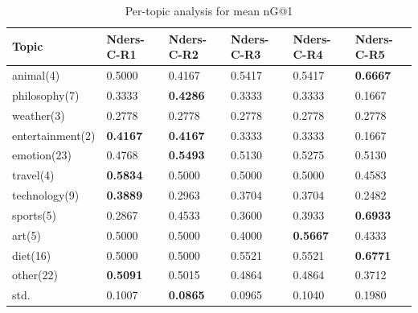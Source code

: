 \documentclass{sig-alternate}
\begin{document}
\begin{table}[]
\centering
\caption{Per-topic analysis for mean nG@1}
\label{my-label}
\begin{tabular}{llllll}
\hline
Topic & Nders-C-R1 & Nders-C-R2 & Nders-C-R3 & Nders-C-R4 & Nders-C-R5 \\
\hline
animal(4) & 0.5000 & 0.4167 & 0.5417 & 0.5417 & \textbf{0.6667} \\
philosophy(7) & 0.3333 & \textbf{0.4286} & 0.3333 & 0.3333 & 0.1667 \\
weather(3) & 0.2778 & 0.2778 & 0.2778 & 0.2778 & 0.2778 \\
entertainment(2) & \textbf{0.4167} & \textbf{0.4167} & 0.3333 & 0.3333 & 0.1667 \\
emotion(23) & 0.4768 & \textbf{0.5493} & 0.5130 & 0.5275 & 0.5130 \\
travel(4) & \textbf{0.5834} & 0.5000 & 0.5000 & 0.5000 & 0.4583 \\
technology(9) & \textbf{0.3889} & 0.2963 & 0.3704 & 0.3704 & 0.2482 \\
sports(5) & 0.2867 & 0.4533 & 0.3600 & 0.3933 & \textbf{0.6933} \\
art(5) & 0.5000 & 0.5000 & 0.4000 & \textbf{0.5667} & 0.4333 \\
diet(16) & 0.5000 & 0.5000 & 0.5521 & 0.5521 & \textbf{0.6771} \\
other(22) & \textbf{0.5091} & 0.5015 & 0.4864 & 0.4864 & 0.3712 \\
\hline
std.   &   0.1007 &    \textbf{0.0865} &    0.0965 &    0.1040 &    0.1980 \\
\hline

\end{tabular}
\end{table}
\end{document}
